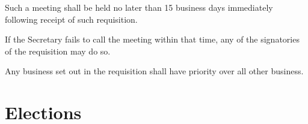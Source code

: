 \documentclass[a4paper]{article}
\begin{document}
\begin{myEnumerate}
\begin{myEnumerate}
            \item Such a meeting shall be held no later than 15 business days immediately following receipt of such requisition.
                \begin{myEnumerate}
                    \item If the Secretary fails to call the meeting within that time, any of the signatories of the requisition may do so.
                \end{myEnumerate}
            \item \label{item:sgm_priority} Any business set out in the requisition shall have priority over all other business.
        \end{myEnumerate}
\end{myEnumerate}


\section{Elections} \label{sec:elections}
\end{document}
